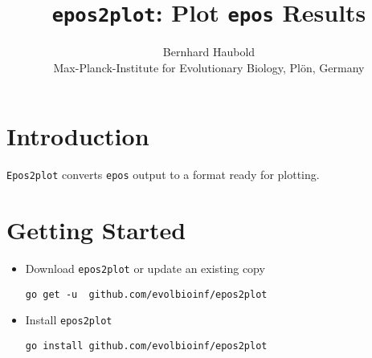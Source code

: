 \documentclass{article}
\newcommand{\ty}{\texttt}
\begin{document}
\title{\ty{epos2plot}: Plot \ty{epos} Results}
\author{Bernhard Haubold\\\small Max-Planck-Institute for Evolutionary Biology, Pl\"on, Germany}
\maketitle
\section{Introduction}
\ty{Epos2plot} converts \ty{epos} output to a format
ready for plotting.
\section{Getting Started}
\begin{itemize}
\item Download \ty{epos2plot} or update an existing copy
  \begin{verbatim}
go get -u  github.com/evolbioinf/epos2plot
\end{verbatim}
\item Install \ty{epos2plot}  
\begin{verbatim}
go install github.com/evolbioinf/epos2plot
\end{verbatim}
\end{itemize}
\end{document}
